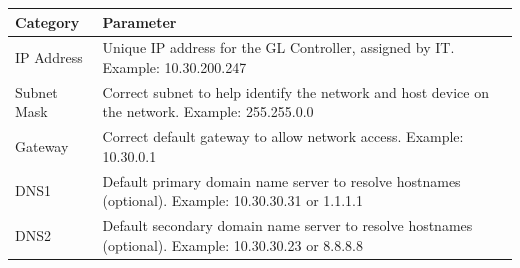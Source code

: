 \begin{longtable}[]{@{}|l|l|@{}}
\toprule
\rowcolor{brown}\begin{minipage}[b]{0.22\columnwidth}\raggedright
{\bf{Category}}\strut
\end{minipage} & \begin{minipage}[b]{0.72\columnwidth}\raggedright
{\bf{Parameter}}\strut
\end{minipage}\tabularnewline
\midrule
\endhead
\begin{minipage}[t]{0.22\columnwidth}\raggedright
IP Address\strut
\end{minipage} & \begin{minipage}[t]{0.72\columnwidth}\raggedright
Unique IP address for the GL Controller, assigned by IT. Example:
10.30.200.247\strut
\end{minipage}\tabularnewline
\begin{minipage}[t]{0.22\columnwidth}\raggedright
Subnet Mask\strut
\end{minipage} & \begin{minipage}[t]{0.72\columnwidth}\raggedright
Correct subnet to help identify the network and host device on the
network. Example: 255.255.0.0\strut
\end{minipage}\tabularnewline
\begin{minipage}[t]{0.22\columnwidth}\raggedright
Gateway\strut
\end{minipage} & \begin{minipage}[t]{0.72\columnwidth}\raggedright
Correct default gateway to allow network access. Example:
10.30.0.1\strut
\end{minipage}\tabularnewline
\begin{minipage}[t]{0.22\columnwidth}\raggedright
DNS1\strut
\end{minipage} & \begin{minipage}[t]{0.72\columnwidth}\raggedright
Default primary domain name server to resolve hostnames (optional).
Example: 10.30.30.31 or 1.1.1.1\strut
\end{minipage}\tabularnewline
\begin{minipage}[t]{0.22\columnwidth}\raggedright
DNS2\strut
\end{minipage} & \begin{minipage}[t]{0.72\columnwidth}\raggedright
Default secondary domain name server to resolve hostnames (optional).
Example: 10.30.30.23 or 8.8.8.8\strut
\end{minipage}\tabularnewline
\bottomrule
\end{longtable}

